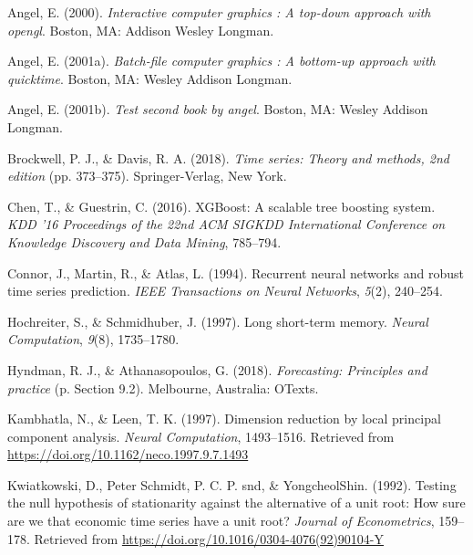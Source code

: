\documentclass[12pt,oneside]{chicagocapstone}
\begin{document}

\noindent

\setlength{\parindent}{-0.20in}
\setlength{\leftskip}{0.20in}
\setlength{\parskip}{8pt}

\hypertarget{refs}{}
\leavevmode\hypertarget{ref-angel2000}{}%
Angel, E. (2000). \emph{Interactive computer graphics : A top-down approach with opengl}. Boston, MA: Addison Wesley Longman.

\leavevmode\hypertarget{ref-angel2001}{}%
Angel, E. (2001a). \emph{Batch-file computer graphics : A bottom-up approach with quicktime}. Boston, MA: Wesley Addison Longman.

\leavevmode\hypertarget{ref-angel2002a}{}%
Angel, E. (2001b). \emph{Test second book by angel}. Boston, MA: Wesley Addison Longman.

\leavevmode\hypertarget{ref-brockwell1991}{}%
Brockwell, P. J., \& Davis, R. A. (2018). \emph{Time series: Theory and methods, 2nd edition} (pp. 373--375). Springer-Verlag, New York.

\leavevmode\hypertarget{ref-chen2016}{}%
Chen, T., \& Guestrin, C. (2016). XGBoost: A scalable tree boosting system. \emph{KDD '16 Proceedings of the 22nd ACM SIGKDD International Conference on Knowledge Discovery and Data Mining}, 785--794.

\leavevmode\hypertarget{ref-connor1994}{}%
Connor, J., Martin, R., \& Atlas, L. (1994). Recurrent neural networks and robust time series prediction. \emph{IEEE Transactions on Neural Networks}, \emph{5}(2), 240--254.

\leavevmode\hypertarget{ref-hochreiter1997}{}%
Hochreiter, S., \& Schmidhuber, J. (1997). Long short-term memory. \emph{Neural Computation}, \emph{9}(8), 1735--1780.

\leavevmode\hypertarget{ref-hyndman2018}{}%
Hyndman, R. J., \& Athanasopoulos, G. (2018). \emph{Forecasting: Principles and practice} (p. Section 9.2). Melbourne, Australia: OTexts.

\leavevmode\hypertarget{ref-kambhatla1997}{}%
Kambhatla, N., \& Leen, T. K. (1997). Dimension reduction by local principal component analysis. \emph{Neural Computation}, 1493--1516. Retrieved from \href{https://doi.org/10.1162/neco.1997.9.7.1493\%20}{https://doi.org/10.1162/neco.1997.9.7.1493 }

\leavevmode\hypertarget{ref-kwiatkowski1992}{}%
Kwiatkowski, D., Peter Schmidt, P. C. P. snd, \& YongcheolShin. (1992). Testing the null hypothesis of stationarity against the alternative of a unit root: How sure are we that economic time series have a unit root? \emph{Journal of Econometrics}, 159--178. Retrieved from \url{https://doi.org/10.1016/0304-4076(92)90104-Y}
\end{document}
